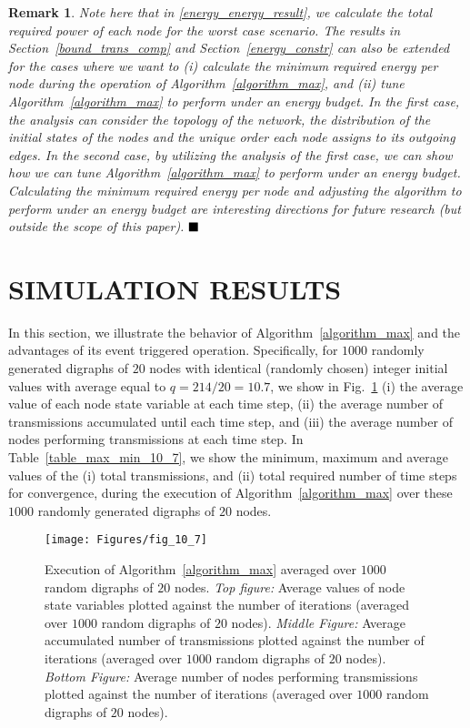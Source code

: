 \documentclass[twocolumn]{autart}    %
\newtheorem{remark}{Remark}
\begin{document}
\begin{remark}
Note here that in \eqref{energy_energy_result}, we calculate the total required power of each node for the worst case scenario. 
The results in Section~\ref{bound_trans_comp} and Section~\ref{energy_constr} can also be extended for the cases where we want to (i) calculate the minimum required energy per node during the operation of Algorithm~\ref{algorithm_max}, and (ii) tune Algorithm~\ref{algorithm_max} to perform under an energy budget. 
In the first case, the analysis can consider the topology of the network, the distribution of the initial states of the nodes and the unique order each node assigns to its outgoing edges. 
In the second case, by utilizing the analysis of the first case, we can show how we can tune Algorithm~\ref{algorithm_max} to perform under an energy budget. 
Calculating the minimum required energy per node and adjusting the algorithm to perform under an energy budget are interesting directions for future research (but outside the scope of this paper).  $\hfill \blacksquare$
\end{remark}



\section{SIMULATION RESULTS}\label{results}

In this section, we illustrate the behavior of Algorithm~\ref{algorithm_max} and the advantages of its event triggered operation.
Specifically, for $1000$ randomly generated digraphs of $20$ nodes with identical (randomly chosen) integer initial values with average equal to $q = 214 / 20 = 10.7$, we show in Fig.~\ref{fig_10_7} (i) the average value of each node state variable at each time step, (ii) the average number of transmissions accumulated until each time step, and (iii) the average number of nodes performing transmissions at each time step. 
In Table~\ref{table_max_min_10_7}, we show the minimum, maximum and average values of the (i) total transmissions, and (ii) total required number of time steps for convergence, during the execution of Algorithm~\ref{algorithm_max} over these $1000$ randomly generated digraphs of $20$ nodes. 


\begin{figure}[t]
\begin{center}
\texttt{[image: Figures/fig\_10\_7]}
\caption{Execution of Algorithm~\ref{algorithm_max} averaged over $1000$ random digraphs of $20$ nodes.  
\textit{Top figure:} Average values of node state variables plotted against the number of iterations (averaged over $1000$ random digraphs of $20$ nodes). \textit{Middle Figure:} Average accumulated number of transmissions plotted against the number of iterations (averaged over $1000$ random digraphs of $20$ nodes). \textit{Bottom Figure:} Average number of nodes performing transmissions plotted against the number of iterations (averaged over $1000$ random digraphs of $20$ nodes)\vspace{-0.2cm}.}
\label{fig_10_7}
\end{center}
\end{figure}
\end{document}
